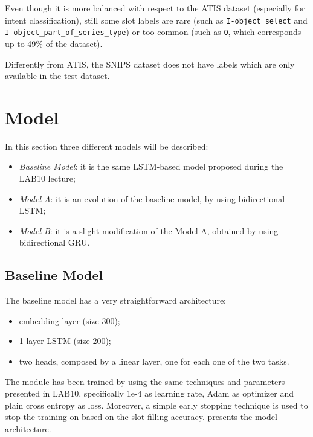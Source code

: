 \documentclass[a4paper]{article}
\begin{document}
Even though it is more balanced with respect to the ATIS dataset (especially for intent classification), still some slot labels are rare (such as \texttt{I-object\_select} and \texttt{I-object\_part\_of\_series\_type}) or too common (such as \texttt{O}, which corresponds up to 49\% of the dataset).

Differently from ATIS, the SNIPS dataset does not have labels which are only available in the test dataset.

\section{Model}
In this section three different models will be described:
\begin{itemize}
    \item \textit{Baseline Model}: it is the same LSTM-based model proposed during the LAB10 lecture;
    \item \textit{Model A}: it is an evolution of the baseline model, by using bidirectional LSTM;
    \item \textit{Model B}: it is a slight modification of the Model A, obtained by using bidirectional GRU.
\end{itemize}

\subsection{Baseline Model}
The baseline model has a very straightforward architecture:
\begin{itemize}
    \item embedding layer (size 300);
    \item 1-layer LSTM (size 200);
    \item two heads, composed by a linear layer, one for each one of the two tasks.
\end{itemize}
The module has been trained by using the same techniques and parameters presented in LAB10, specifically 1e-4 as learning rate, Adam as optimizer and plain cross entropy as loss. Moreover, a simple early stopping technique is used to stop the training on based on the slot filling accuracy.  presents the model architecture.
\end{document}
